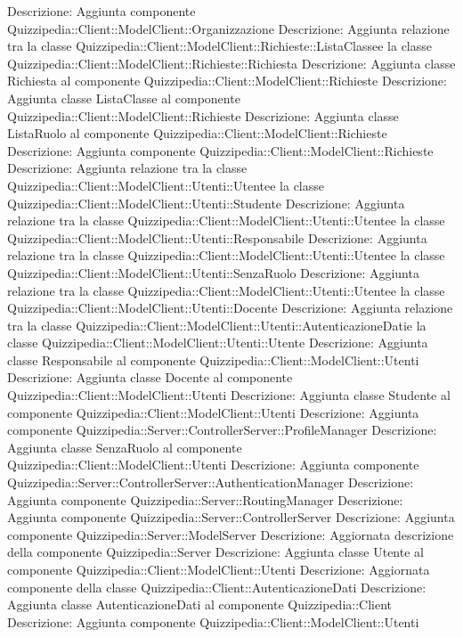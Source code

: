 Descrizione: Aggiunta componente Quizzipedia::Client::ModelClient::Organizzazione 
Descrizione: Aggiunta relazione tra la classe Quizzipedia::Client::ModelClient::Richieste::ListaClassee la classe Quizzipedia::Client::ModelClient::Richieste::Richiesta 
Descrizione: Aggiunta classe Richiesta al componente Quizzipedia::Client::ModelClient::Richieste 
Descrizione: Aggiunta classe ListaClasse al componente Quizzipedia::Client::ModelClient::Richieste 
Descrizione: Aggiunta classe ListaRuolo al componente Quizzipedia::Client::ModelClient::Richieste 
Descrizione: Aggiunta componente Quizzipedia::Client::ModelClient::Richieste 
Descrizione: Aggiunta relazione tra la classe Quizzipedia::Client::ModelClient::Utenti::Utentee la classe Quizzipedia::Client::ModelClient::Utenti::Studente 
Descrizione: Aggiunta relazione tra la classe Quizzipedia::Client::ModelClient::Utenti::Utentee la classe Quizzipedia::Client::ModelClient::Utenti::Responsabile 
Descrizione: Aggiunta relazione tra la classe Quizzipedia::Client::ModelClient::Utenti::Utentee la classe Quizzipedia::Client::ModelClient::Utenti::SenzaRuolo 
Descrizione: Aggiunta relazione tra la classe Quizzipedia::Client::ModelClient::Utenti::Utentee la classe Quizzipedia::Client::ModelClient::Utenti::Docente 
Descrizione: Aggiunta relazione tra la classe Quizzipedia::Client::ModelClient::Utenti::AutenticazioneDatie la classe Quizzipedia::Client::ModelClient::Utenti::Utente 
Descrizione: Aggiunta classe Responsabile al componente Quizzipedia::Client::ModelClient::Utenti 
Descrizione: Aggiunta classe Docente al componente Quizzipedia::Client::ModelClient::Utenti 
Descrizione: Aggiunta classe Studente al componente Quizzipedia::Client::ModelClient::Utenti 
Descrizione: Aggiunta componente Quizzipedia::Server::ControllerServer::ProfileManager 
Descrizione: Aggiunta classe SenzaRuolo al componente Quizzipedia::Client::ModelClient::Utenti 
Descrizione: Aggiunta componente Quizzipedia::Server::ControllerServer::AuthenticationManager 
Descrizione: Aggiunta componente Quizzipedia::Server::RoutingManager 
Descrizione: Aggiunta componente Quizzipedia::Server::ControllerServer 
Descrizione: Aggiunta componente Quizzipedia::Server::ModelServer 
Descrizione: Aggiornata descrizione della componente Quizzipedia::Server 
Descrizione: Aggiunta classe Utente al componente Quizzipedia::Client::ModelClient::Utenti 
Descrizione: Aggiornata componente della classe Quizzipedia::Client::AutenticazioneDati 
Descrizione: Aggiunta classe AutenticazioneDati al componente Quizzipedia::Client 
Descrizione: Aggiunta componente Quizzipedia::Client::ModelClient::Utenti 
